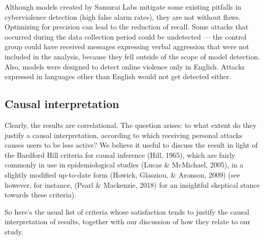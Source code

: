 \documentclass[10pt,dvipsnames]{scrartcl}
\begin{document}
Although models created by Samurai Labs mitigate some existing pitfalls
in cyberviolence detection (high false alarm rates), they are not
without flaws. Optimizing for precision can lead to the reduction of
recall. Some attacks that occurred during the data collection period
could be undetected --- the control group could have received messages
expressing verbal aggression that were not included in the analysis,
because they fell outside of the scope of model detection. Also, models
were designed to detect online violence only in English. Attacks
expressed in languages other than English would not get detected either.

\subsection{Causal interpretation}

Clearly, the results are correlational. The question arises: to what
extent do they justify a causal interpretation, according to which
receiving personal attacks causes users to be less active? We believe it
useful to discuss the result in light of the Bardford Hill criteria for
causal inference (Hill, 1965), which are fairly commonly in use in
epidemiological studies (Lucas \& McMichael, 2005), in a slightly
modified up-to-date form (Howick, Glasziou, \& Aronson, 2009) (see
however, for instance, (Pearl \& Mackenzie, 2018) for an insightful
skeptical stance towards these criteria).

So here's the usual list of criteria whose satisfaction tends to justify
the causal interpretation of results, together with our discussion of
how they relate to our study.

\vspace{2mm}
\end{document}
